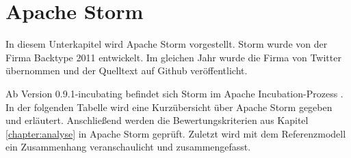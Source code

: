 \section{Apache Storm}
\label{section:storm}

In diesem Unterkapitel wird Apache Storm vorgestellt. Storm wurde von der Firma Backtype 2011 entwickelt. Im gleichen Jahr wurde die Firma von Twitter übernommen und der Quelltext auf Github veröffentlicht.  

Ab Version 0.9.1-incubating befindet sich Storm im Apache Incubation-Prozess . In der folgenden Tabelle wird eine Kurzübersicht über Apache Storm gegeben und erläutert. Anschließend werden die Bewertungskriterien aus Kapitel \ref{chapter:analyse} in Apache Storm geprüft. Zuletzt wird mit dem Referenzmodell ein Zusammenhang veranschaulicht und zusammengefasst.